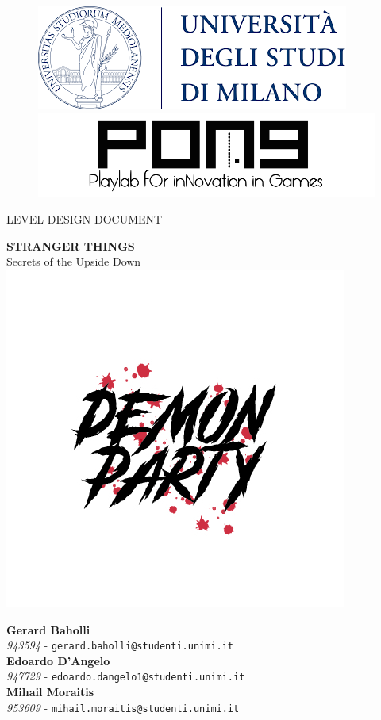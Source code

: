 \thispagestyle{empty}
{

	\begin{figure}
		\begin{minipage}{0.5\textwidth}
			\centering
			\includegraphics[width=0.6\linewidth]{images/logos/unimi_logo.png}
		\end{minipage}\hfill
		\begin{minipage}{0.5\textwidth}
			\centering
			\includegraphics[width=0.6\linewidth]{images/logos/pong_logo.png}
		\end{minipage}
	\end{figure}

	\vspace*{0.6cm}
	\begin{center}
		\Huge LEVEL DESIGN DOCUMENT\\
	\end{center}
	
	\vspace{0.6cm}
	\begin{center}
		\Huge \textbf{STRANGER THINGS}\\
		\Huge {Secrets of the Upside Down}\\
		\includegraphics[width=0.7\linewidth]{images/logos/demonparty_logo.jpg}\\[4ex]
	\end{center}

	\vfill
	\textbf{Gerard Baholli}\\
	\textit{943594} - \texttt{gerard.baholli@studenti.unimi.it}\\
	
	\textbf{Edoardo D'Angelo}\\
	\textit{947729} - \texttt{edoardo.dangelo1@studenti.unimi.it}\\
	
	\textbf{Mihail Moraitis}\\
	\textit{953609} - \texttt{mihail.moraitis@studenti.unimi.it}\\

}